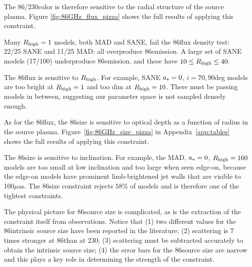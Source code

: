 The 86\GHz/230\GHz color is therefore sensitive to the radial structure of the source plasma.  Figure \ref{fig:86GHz_flux_pizza} shows the full results of applying this constraint.


Many $R_\mathrm{high} = 1$ models, both MAD and SANE, fail the 86\GHz flux density test: 22/25 SANE and 11/25 MAD; all overproduce 86\GHz emission.  A large set of SANE models (17/100) underproduce 86\GHz emission, and these have $10 \le R_\mathrm{high} \le 40$.

The 86\GHz flux is sensitive to $R_\mathrm{high}$.  For example, SANE $a_* = 0$, $i = 70,90$deg models are too bright at $R_\mathrm{high} = 1$ and too dim at $R_\mathrm{high} = 10$.  There must be passing models in between, suggesting our parameter space is not sampled densely enough.



As for the 86\GHz flux, the 86\GHz size is sensitive to optical depth as a function of radius in the source plasma. Figure~\ref{fig:86GHz_size_pizza} in Appendix~\ref{app:tables} shows the full results of applying this constraint.


The 86\GHz size is sensitive to inclination.  For example, the MAD, $a_* = 0$, $R_\mathrm{high} = 160$ models are too small at low inclination and too large when seen edge-on, because the edge-on models have prominent limb-brightened jet walls that are visible to 100$\mu$as.  The 86\GHz size constraint rejects
$58\%$ of models and is therefore one of the tightest constraints.

The physical picture for 86\GHz source size is complicated, as is the extraction of the constraint itself from observations.  Notice that (1) two different values for the 86\GHz intrinsic source size have been reported in the literature; (2) scattering is $7$ times stronger at 86\GHz than at 230\GHz; (3) scattering must be subtracted accurately to obtain the intrinsic source size; (4) the error bars for the 86\GHz source size are narrow and this plays a key role in determining the strength of the constraint.

